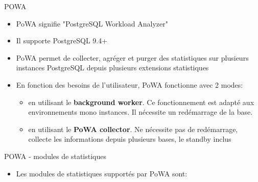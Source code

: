 \begin{frame}{POWA}

   \begin{itemize}
      \item PoWA signifie "PostgreSQL Workload Analyzer"
      \item Il supporte PostgreSQL 9.4+
      \item PoWA permet de collecter, agréger et purger des statistiques sur plusieurs instances PostgreSQL depuis plusieurs extensions statistiques
      \item En fonction des besoins de l'utilisateur, PoWA fonctionne avec 2 modes:
   \begin{itemize}
         \item en utilisant le \textbf{background worker}. Ce fonctionnement est adapté aux environnements mono instances. Il nécessite un redémarrage de la base.
         \item en utilisant le \textbf{PoWA collector}. Ne nécessite pas de redémarrage, collecte les informations depuis plusieurs bases, le standby inclus
   \end{itemize}

   \end{itemize}

\begin{tiny}
\begin{toile}
\end{toile}
\end{tiny}

\end{frame}


\begin{frame}{POWA - modules de statistiques}

   \begin{itemize}
      \item Les modules de statistiques supportés par PoWA sont:
   \end{itemize}

\end{frame}



